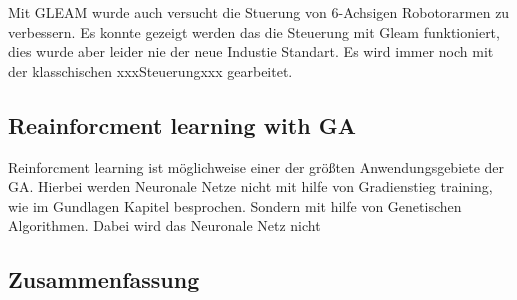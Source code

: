 Mit GLEAM wurde auch versucht die Stuerung von 6-Achsigen Robotorarmen zu verbessern. Es konnte gezeigt werden das die Steuerung mit Gleam funktioniert, dies wurde aber leider nie der neue Industie Standart. Es wird immer noch mit der klasschischen xxxSteuerungxxx  gearbeitet. 


\subsection{Reainforcment learning with GA}
Reinforcment learning ist möglichweise einer der größten Anwendungsgebiete der GA. Hierbei werden Neuronale Netze nicht mit hilfe von Gradienstieg training, wie im Gundlagen Kapitel besprochen. Sondern mit hilfe von Genetischen Algorithmen. Dabei wird das Neuronale Netz nicht 




\subsection{Zusammenfassung}